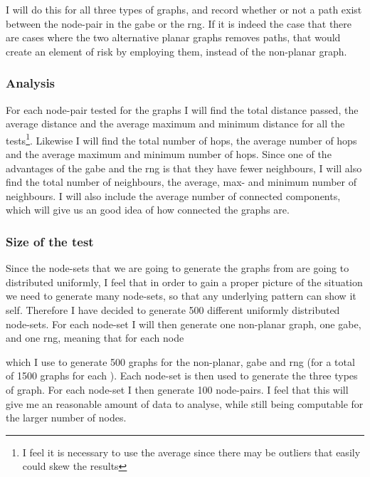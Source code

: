 I will do this for all three types of graphs, and record whether or not a path exist between the node-pair in the \ac{gabe} or the \ac{rng}. If it is indeed the case that there are cases where the two alternative planar graphs removes paths, that would create an element of risk by employing them, instead of the non-planar graph.

\subsubsection{Analysis}
For each node-pair tested for the graphs I will find the total distance passed, the average distance and the average maximum and minimum distance for all the tests\footnote{I feel it is necessary to use the average since there may be outliers that easily could skew the results}. Likewise I will find the total number of hops, the average number of hops and the average maximum and minimum number of hops. Since one of the advantages of the \ac{gabe} and the \ac{rng} is that they have fewer neighbours, I will also find the total number of neighbours, the average, max- and minimum number of neighbours. I will also include the average number of connected components, which will give us an good idea of how connected the graphs are.

\subsubsection{Size of the test}
Since the node-sets that we are going to generate the graphs from are going to distributed uniformly, I feel that in order to gain a proper picture of the situation we need to generate many node-sets, so that any underlying pattern can show it self. Therefore I have decided to generate 500 different uniformly distributed node-sets. For each node-set I will then generate one non-planar graph, one \ac{gabe}, and one \ac{rng}, meaning that for each node 

  which I use to generate 500 graphs for the non-planar, \ac{gabe} and \ac{rng} (for a total of 1500 graphs for each ). Each node-set is then used to generate the three types of graph. For each node-set I then generate 100 node-pairs. I feel that this will give me an reasonable amount of data to analyse, while still being computable for the larger number of nodes.

